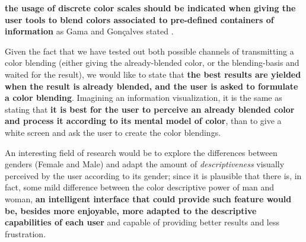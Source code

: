 \textbf{the usage of discrete color scales should be indicated when giving the user tools to blend colors associated to pre-defined containers of information} as Gama and Gonçalves stated \cite{Gama20142}. \par
%
Given the fact that we have tested out both possible channels of transmitting a color blending (either giving the already-blended color, or the blending-basis and waited for the result), we would like to state that \textbf{the best results are yielded when the result is already
blended, and the user is asked to formulate a color blending}. Imagining an information visualization, it is the same as stating that \textbf{it is best for the user to perceive an already blended color and process it according to its mental model of color}, than to give a white
screen and ask the user to create the color blendings. \par
%
An interesting field of research would be to explore the differences between genders (Female and Male) and adapt the amount of \emph{descriptiveness} visually perceived by the user according to its gender; since it is plausible that there is, in fact, some mild difference between
the color descriptive power of man and woman, \textbf{an intelligent interface that could provide such feature would be, besides more enjoyable, more adapted to the descriptive capabilities of each user} and capable of providing better results and less frustration.
%
